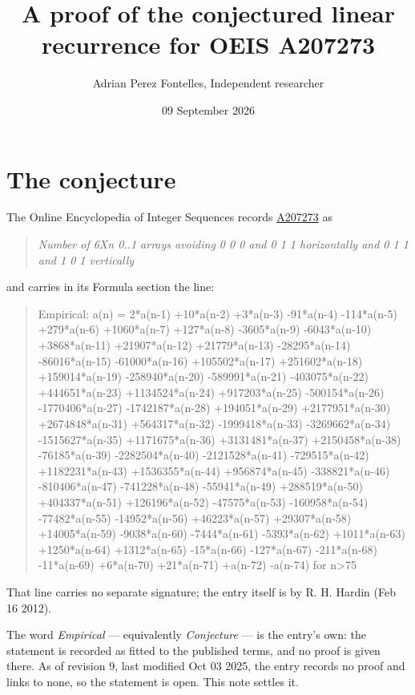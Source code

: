 \documentclass[11pt]{article}
\title{A proof of the conjectured linear recurrence for OEIS A207273}
\author{Adrian Perez Fontelles, Independent researcher}
\date{09 September 2026}
\theoremstyle{definition}
\begin{document}
\maketitle
\section{The conjecture}

The Online Encyclopedia of Integer Sequences records \href{https://oeis.org/A207273}{A207273} as

\begin{quote}\itshape Number of 6Xn 0..1 arrays avoiding 0 0 0 and 0 1 1 horizontally and 0 1 1 and 1 0 1 vertically\end{quote}

and carries in its Formula section the line:

\begin{quote}\ttfamily Empirical: a(n) = 2*a(n-1) +10*a(n-2) +3*a(n-3) -91*a(n-4) -114*a(n-5) +279*a(n-6) +1060*a(n-7) +127*a(n-8) -3605*a(n-9) -6043*a(n-10) +3868*a(n-11) +21907*a(n-12) +21779*a(n-13) -28295*a(n-14) -86016*a(n-15) -61000*a(n-16) +105502*a(n-17) +251602*a(n-18) +159014*a(n-19) -258940*a(n-20) -589991*a(n-21) -403075*a(n-22) +444651*a(n-23) +1134524*a(n-24) +917203*a(n-25) -500154*a(n-26) -1770406*a(n-27) -1742187*a(n-28) +194051*a(n-29) +2177951*a(n-30) +2674848*a(n-31) +564317*a(n-32) -1999418*a(n-33) -3269662*a(n-34) -1515627*a(n-35) +1171675*a(n-36) +3131481*a(n-37) +2150458*a(n-38) -76185*a(n-39) -2282504*a(n-40) -2121528*a(n-41) -729515*a(n-42) +1182231*a(n-43) +1536355*a(n-44) +956874*a(n-45) -338821*a(n-46) -810406*a(n-47) -741228*a(n-48) -55941*a(n-49) +288519*a(n-50) +404337*a(n-51) +126196*a(n-52) -47575*a(n-53) -160958*a(n-54) -77482*a(n-55) -14952*a(n-56) +46223*a(n-57) +29307*a(n-58) +14005*a(n-59) -9038*a(n-60) -7444*a(n-61) -5393*a(n-62) +1011*a(n-63) +1250*a(n-64) +1312*a(n-65) -15*a(n-66) -127*a(n-67) -211*a(n-68) -11*a(n-69) +6*a(n-70) +21*a(n-71) +a(n-72) -a(n-74) for n>75\end{quote}

That line carries no separate signature; the entry itself is by R. H. Hardin (Feb 16 2012).

The word {\itshape Empirical} --- equivalently {\itshape Conjecture} --- is the entry's own: the statement is recorded as fitted to the published terms, and no proof is given there. As of revision 9, last modified Oct 03 2025, the entry records no proof and links to none, so the statement is open. This note settles it.
\end{document}
